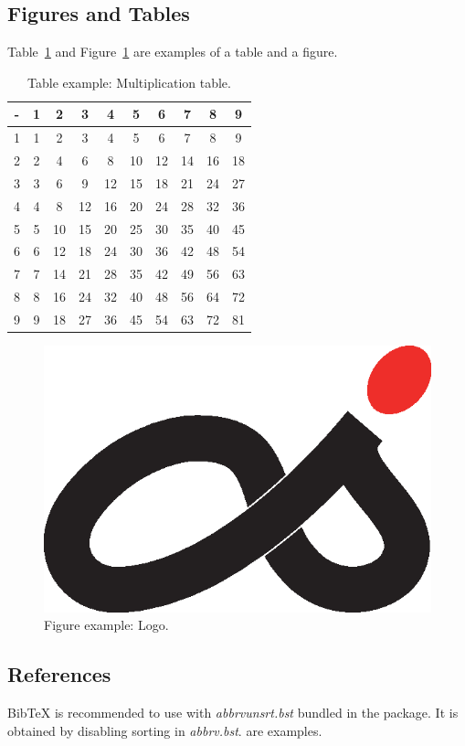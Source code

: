 \documentclass[a4paper,twoside,twocolumn,10pt]{article}
\begin{document}
\subsection{Figures and Tables}
Table~\ref{tbl:kuku} and Figure~\ref{fig:CSIS_logo}
are examples of a table and a figure.

\begin{table}[tb]
  \caption{Table example: Multiplication table.}
  \label{tbl:kuku}
  \centering
  \begin{tabular}{|c||c|c|c|c|c|c|c|c|c|} \hline
    - &  1 &  2 &  3 &  4 &  5 &  6 &  7 &  8 &  9 \\ \hline \hline
    1 &  1 &  2 &  3 &  4 &  5 &  6 &  7 &  8 &  9 \\ \hline
    2 &  2 &  4 &  6 &  8 & 10 & 12 & 14 & 16 & 18 \\ \hline
    3 &  3 &  6 &  9 & 12 & 15 & 18 & 21 & 24 & 27 \\ \hline
    4 &  4 &  8 & 12 & 16 & 20 & 24 & 28 & 32 & 36 \\ \hline
    5 &  5 & 10 & 15 & 20 & 25 & 30 & 35 & 40 & 45 \\ \hline
    6 &  6 & 12 & 18 & 24 & 30 & 36 & 42 & 48 & 54 \\ \hline
    7 &  7 & 14 & 21 & 28 & 35 & 42 & 49 & 56 & 63 \\ \hline
    8 &  8 & 16 & 24 & 32 & 40 & 48 & 56 & 64 & 72 \\ \hline
    9 &  9 & 18 & 27 & 36 & 45 & 54 & 63 & 72 & 81 \\ \hline
  \end{tabular}
\end{table}

\begin{figure}[tb]
  \centering
  \includegraphics[width=.3\hsize]{CSIS.eps}
  \caption{Figure example: Logo.}
  \label{fig:CSIS_logo}
\end{figure}

\subsection{References}
BibTeX is recommended to use with \textit{abbrvunsrt.bst}
bundled in the package.
It is obtained by disabling sorting in \textit{abbrv.bst}.
\cite{SakaiMe, Food, Neko} are examples.
\end{document}
